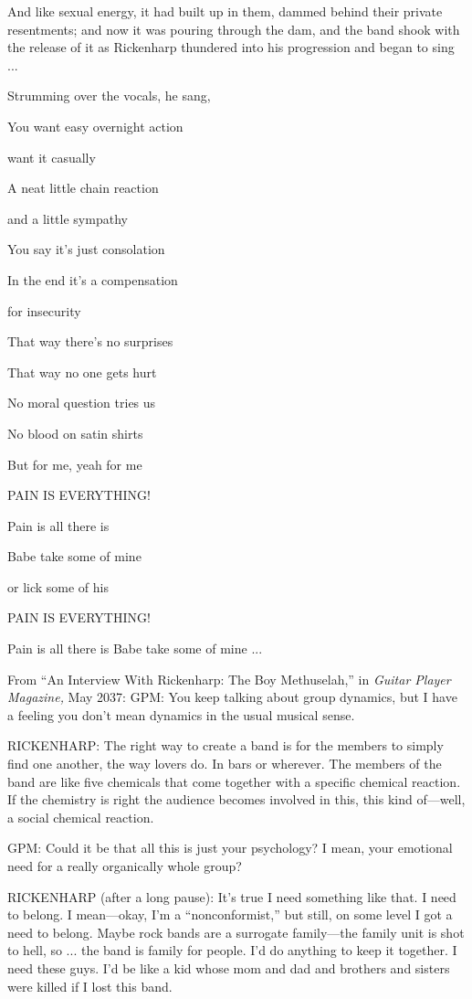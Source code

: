 And like sexual energy, it had built up in them, dammed behind their private resentments; and now it was pouring through the dam, and the band shook with the release of it as Rickenharp thundered into his progression and began to sing ...

Strumming over the vocals, he sang,

You want easy overnight action

want it casually

A neat little chain reaction

and a little sympathy

You say it's just consolation

In the end it's a compensation

for insecurity

That way there's no surprises

That way no one gets hurt

No moral question tries us

No blood on satin shirts

But for me, yeah for me

PAIN IS EVERYTHING!

Pain is all there is

Babe take some of mine

or lick some of his

PAIN IS EVERYTHING!

Pain is all there is Babe take some of mine ...

From ``An Interview With Rickenharp: The Boy Methuselah,'' in \textit{Guitar Player Magazine,} May 2037: GPM: You keep talking about group dynamics, but I have a feeling you don't mean dynamics in the usual musical sense.

RICKENHARP: The right way to create a band is for the members to simply find one another, the way lovers do. In bars or wherever. The members of the band are like five chemicals that come together with a specific chemical reaction. If the chemistry is right the audience becomes involved in this, this kind of---well, a social chemical reaction.

GPM: Could it be that all this is just your psychology? I mean, your emotional need for a really organically whole group?

RICKENHARP (after a long pause): It's true I need something like that. I need to belong. I mean---okay, I'm a ``nonconformist,'' but still, on some level I got a need to belong. Maybe rock bands are a surrogate family---the family unit is shot to hell, so ... the band is family for people. I'd do anything to keep it together. I need these guys. I'd be like a kid whose mom and dad and brothers and sisters were killed if I lost this band.

